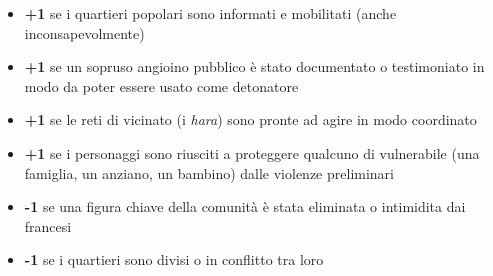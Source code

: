 \begin{itemize}[nosep]
  \item \textbf{+1} se i quartieri popolari sono informati e mobilitati
    (anche inconsapevolmente)
  \item \textbf{+1} se un sopruso angioino pubblico è stato documentato
    o testimoniato in modo da poter essere usato come detonatore
  \item \textbf{+1} se le reti di vicinato (i \textit{hara}) sono
    pronte ad agire in modo coordinato
  \item \textbf{+1} se i personaggi sono riusciti a proteggere
    qualcuno di vulnerabile (una famiglia, un anziano, un bambino)
    dalle violenze preliminari
  \item \textbf{-1} se una figura chiave della comunità è stata
    eliminata o intimidita dai francesi
  \item \textbf{-1} se i quartieri sono divisi o in conflitto tra loro
\end{itemize}


\filettodoppio
